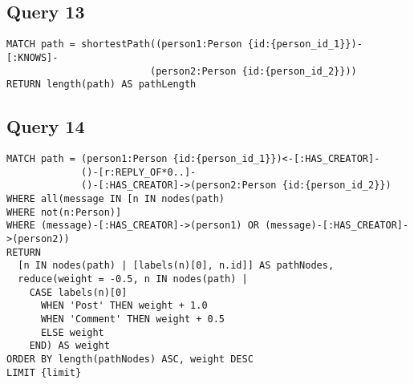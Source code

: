 \subsection{Query 13}

\begin{verbatim}
MATCH path = shortestPath((person1:Person {id:{person_id_1}})-[:KNOWS]-
                         (person2:Person {id:{person_id_2}}))
RETURN length(path) AS pathLength
\end{verbatim}

\subsection{Query 14}

\begin{verbatim}
MATCH path = (person1:Person {id:{person_id_1}})<-[:HAS_CREATOR]-
             ()-[r:REPLY_OF*0..]-
             ()-[:HAS_CREATOR]->(person2:Person {id:{person_id_2}})
WHERE all(message IN [n IN nodes(path) 
WHERE not(n:Person)] 
WHERE (message)-[:HAS_CREATOR]->(person1) OR (message)-[:HAS_CREATOR]->(person2))
RETURN
  [n IN nodes(path) | [labels(n)[0], n.id]] AS pathNodes,
  reduce(weight = -0.5, n IN nodes(path) | 
    CASE labels(n)[0]
      WHEN 'Post' THEN weight + 1.0
      WHEN 'Comment' THEN weight + 0.5
      ELSE weight
    END) AS weight
ORDER BY length(pathNodes) ASC, weight DESC
LIMIT {limit}
\end{verbatim}


